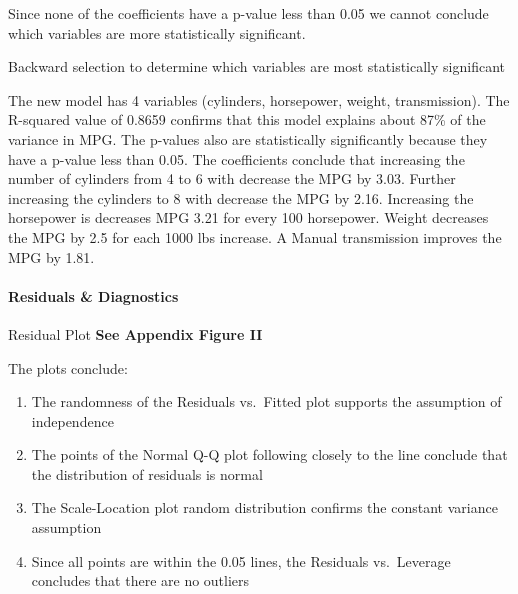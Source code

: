 \documentclass[]{article}
\newenvironment{Shaded}{\begin{snugshade}}{\end{snugshade}}
\newcommand{\CommentTok}[1]{\textcolor[rgb]{0.56,0.35,0.01}{\textit{#1}}}
\newcommand{\KeywordTok}[1]{\textcolor[rgb]{0.13,0.29,0.53}{\textbf{#1}}}
\newcommand{\NormalTok}[1]{#1}
\newcommand{\OperatorTok}[1]{\textcolor[rgb]{0.81,0.36,0.00}{\textbf{#1}}}
\newcommand{\StringTok}[1]{\textcolor[rgb]{0.31,0.60,0.02}{#1}}
\providecommand{\tightlist}{%
  \setlength{\itemsep}{0pt}\setlength{\parskip}{0pt}}
\let\oldparagraph\paragraph
\renewcommand{\paragraph}[1]{\oldparagraph{#1}\mbox{}}
\begin{document}
Since none of the coefficients have a p-value less than 0.05 we cannot
conclude which variables are more statistically significant.

Backward selection to determine which variables are most statistically
significant

\begin{Shaded}
\end{Shaded}

The new model has 4 variables (cylinders, horsepower, weight,
transmission). The R-squared value of 0.8659 confirms that this model
explains about 87\% of the variance in MPG. The p-values also are
statistically significantly because they have a p-value less than 0.05.
The coefficients conclude that increasing the number of cylinders from 4
to 6 with decrease the MPG by 3.03. Further increasing the cylinders to
8 with decrease the MPG by 2.16. Increasing the horsepower is decreases
MPG 3.21 for every 100 horsepower. Weight decreases the MPG by 2.5 for
each 1000 lbs increase. A Manual transmission improves the MPG by 1.81.

\hypertarget{residuals-diagnostics}{%
\paragraph{Residuals \& Diagnostics}\label{residuals-diagnostics}}

Residual Plot \textbf{See Appendix Figure II}

The plots conclude:

\begin{enumerate}
\def\labelenumi{\arabic{enumi}.}
\tightlist
\item
  The randomness of the Residuals vs.~Fitted plot supports the
  assumption of independence
\item
  The points of the Normal Q-Q plot following closely to the line
  conclude that the distribution of residuals is normal
\item
  The Scale-Location plot random distribution confirms the constant
  variance assumption
\item
  Since all points are within the 0.05 lines, the Residuals vs.~Leverage
  concludes that there are no outliers
\end{enumerate}
\end{document}
